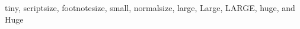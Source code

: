 \documentclass{article}
\begin{document}
\noindent \tiny tiny, \scriptsize scriptsize, \footnotesize footnotesize, \small small,
\normalsize normalsize, \large large, \Large Large, \LARGE LARGE, \huge huge, and \Huge Huge
\end{document}
